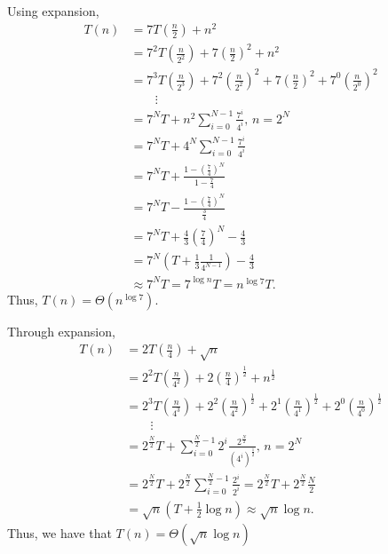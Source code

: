 \documentclass[a4paper]{report}
\begin{document}
Using expansion,
\begin{align*}
    T\left( n \right) &= 7 T\left( \frac{n}{2} \right) + n^2 \\
    &= 7^{2} T\left( \frac{n}{2^2} \right) + 7 \left(  \frac{n}{2}\right)^2 + n^2 \\
    &= 7^{3} T\left( \frac{n}{2^3} \right) + 7^2 \left(  \frac{n}{2^2}\right)^2 + 7 \left(  \frac{n}{2}\right)^2 + 7^{0}\left( \frac{n}{2^{0}} \right)^2 \\
    &\quad\quad\vdots \\
    &= 7^{N}T + n^2 \sum_{i=0}^{N-1} \frac{7^{i}}{4^{i} },\, n = 2^{N} \\
    &= 7^{N}T + 4^{N} \sum_{i=0}^{N-1} \frac{7^{i}}{4^{i} } \\
    &= 7^{N}T + \frac{1 - \left( \frac{7}{4} \right)^{N} }{1- \frac{7}{4}} \\
    &= 7^{N}T - \frac{1 - \left( \frac{7}{4} \right)^{N} }{\frac{3}{4}} \\
    &= 7^{N}T + \frac{4}{3}\left( \frac{7}{4} \right)^{N} - \frac{4}{3} \\
    &= 7^{N} \left( T +\frac{1}{3}\frac{1}{4^{N-1}} \right) - \frac{4}{3} \\
    &\approx 7^{N} T = 7^{\log n} T = n^{\log 7} T
.\end{align*}
Thus, $T\left( n \right) = \Theta\left( n^{\log 7} \right) $.


Through expansion,
\begin{align*}
    T\left( n \right) &= 2 T\left( \frac{n}{4} \right) + \sqrt{n}  \\
    &= 2^2 T\left( \frac{n}{4^{2}} \right) + 2 \left( \frac{n}{4} \right) ^{\frac{1}{2}} + n^{\frac{1}{2}}  \\
    &= 2^3 T\left( \frac{n}{4^{3}} \right) + 2^{2} \left( \frac{n}{4^{2}} \right) ^{\frac{1}{2}}+ 2^{1} \left( \frac{n}{4^{1}} \right) ^{\frac{1}{2}} + 2^{0} \left( \frac{n}{4^{0}} \right) ^{\frac{1}{2}}  \\
    &\quad\quad\vdots \\
    &= 2^{\frac{N}{2}}T +\sum_{i=0}^{\frac{N}{2}-1} 2^{i}\frac{2^{\frac{N}{2}}}{\left( 4^i \right)^{\frac{1}{2}}}, \, n = 2^{N} \\
    &= 2^{\frac{N}{2}}T + 2^{\frac{N}{2}} \sum_{i=0}^{\frac{N}{2} -1} \frac{2^{i}}{2^{i}} = 2^{\frac{N}{2}}T + 2^{\frac{N}{2}} \frac{N}{2} \\
    &= \sqrt{n} \left( T + \frac{1}{2} \log n \right) \approx \sqrt{n} \log n 
.\end{align*}
Thus, we have that $T\left( n \right) = \Theta\left( \sqrt{n} \log n \right) $
\end{document}
